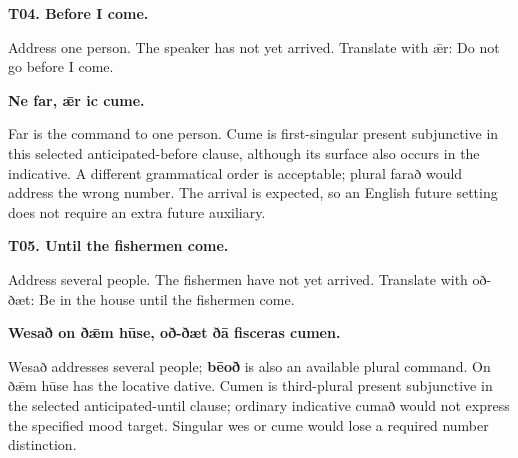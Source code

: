 \par\begin{minipage}{\linewidth}\raggedright
\textbf{T04. Before I come.}

Address one person. The speaker has not yet arrived. Translate with ǣr: Do not go before I come.

\textbf{Ne far, ǣr ic cume.}

Far is the command to one person. Cume is first-singular present subjunctive in this selected anticipated-before clause, although its surface also occurs in the indicative. A different grammatical order is acceptable; plural farað would address the wrong number. The arrival is expected, so an English future setting does not require an extra future auxiliary.

\end{minipage}\par\addvspace{4pt}

\par\begin{minipage}{\linewidth}\raggedright
\textbf{T05. Until the fishermen come.}

Address several people. The fishermen have not yet arrived. Translate with oð-ðæt: Be in the house until the fishermen come.

\textbf{Wesað on ðǣm hūse, oð-ðæt ðā fisceras cumen.}

Wesað addresses several people; \textbf{bēoð} is also an available plural command. On ðǣm hūse has the locative dative. Cumen is third-plural present subjunctive in the selected anticipated-until clause; ordinary indicative cumað would not express the specified mood target. Singular wes or cume would lose a required number distinction.

\end{minipage}\par\addvspace{4pt}

